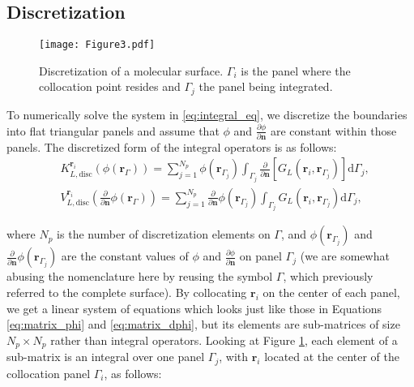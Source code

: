 

\subsection{Discretization}

 \begin{figure}[b]
   \centering
   \texttt{[image: Figure3.pdf]} 
   \caption{Discretization of a molecular surface. $\Gamma_i$ is the panel where the collocation point resides and $\Gamma_j$ the panel being integrated.}
   \label{fig:molecule_disc}
\end{figure}

To numerically solve the system in \eqref{eq:integral_eq}, we discretize the boundaries into flat triangular panels and assume that $\phi$ and $\frac{\partial \phi}{\partial \mathbf{n}}$ are constant within those panels. The discretized form of the integral operators is as follows:
%
\begin{align} \label{eq:layers_disc}
&K_{L,\text{disc}}^{\mathbf{r}_i}(\phi(\mathbf{r}_{\Gamma})) =  \sum_{j=1}^{N_p}\phi(\mathbf{r}_{\Gamma_j})\int_{\Gamma_j} \frac{\partial}{\partial \mathbf{n}} \left[ G_L(\mathbf{r}_{i},\mathbf{r}_{\Gamma_j}) \right]\mathrm{d} \Gamma_j,  \nonumber \\
&V_{L,\text{disc}}^{\mathbf{r}_i} \left( \frac{\partial}{\partial \mathbf{n}} \phi(\mathbf{r}_{\Gamma}) \right) = \sum_{j=1}^{N_p} \frac{\partial}{\partial \mathbf{n}} \phi(\mathbf{r}_{\Gamma_j}) \int_{\Gamma_j} G_L(\mathbf{r}_{i},\mathbf{r}_{\Gamma_j})  \mathrm{d} \Gamma_j,
\end{align}

\noindent where $N_p$ is the number of discretization elements on $\Gamma$, and $\phi(\mathbf{r}_{\Gamma_j})$ and $\frac{\partial}{\partial \mathbf{n}} \phi(\mathbf{r}_{\Gamma_j})$ are the constant values of $\phi$ and $\frac{\partial \phi}{\partial \mathbf{n}}$ on panel $\Gamma_j$ (we are somewhat abusing the nomenclature here by reusing the symbol $\Gamma$, which previously referred to the complete surface). By collocating $\mathbf{r}_i$ on the center of each panel, we get a linear system of equations which looks just like those in Equations \eqref{eq:matrix_phi} and  \eqref{eq:matrix_dphi}, but its elements are sub-matrices of size $N_p \times N_p$ rather than integral operators. Looking at Figure \ref{fig:molecule_disc}, each element of a sub-matrix is an integral over one panel $\Gamma_j$, with $\mathbf{r}_i$ located at the center of the collocation panel $\Gamma_i$, as follows:

